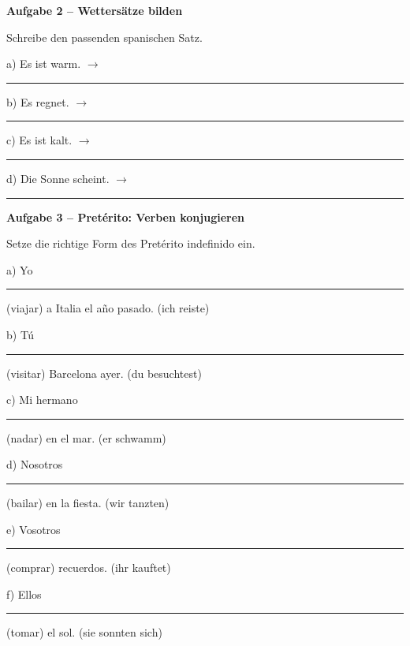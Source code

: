 \documentclass[11pt, a4paper]{article}
\newcommand{\fachfarbe}{spanisch}
\newcommand{\punktebox}[1]{\hfill\fbox{\small \_/#1}}
\newcommand{\luecke}[1]{\rule{#1}{0.4pt}}
\newenvironment{aufgabe}[1]{%
    \needspace{5\baselineskip}%
    \nopagebreak[4]%
    \vspace{10pt}
    \noindent\textbf{\textcolor{\fachfarbe}{Aufgabe #1}}
    \nopagebreak[4]%
    \vspace{5pt}
    \nopagebreak[4]%
    \begin{list}{}{\leftmargin=0pt}
    \item[]
}{%
    \end{list}
}
\begin{document}
\begin{aufgabe}{2 -- Wettersätze bilden}
Schreibe den passenden spanischen Satz. \punktebox{4}
\end{aufgabe}

\noindent
a) Es ist warm. $\rightarrow$ \luecke{6cm}

\vspace{0.8em}

\noindent
b) Es regnet. $\rightarrow$ \luecke{6cm}

\vspace{0.8em}

\noindent
c) Es ist kalt. $\rightarrow$ \luecke{6cm}

\vspace{0.8em}

\noindent
d) Die Sonne scheint. $\rightarrow$ \luecke{6cm}

\vspace{15pt}


\begin{aufgabe}{3 -- Pretérito: Verben konjugieren}
Setze die richtige Form des Pretérito indefinido ein. \punktebox{6}
\end{aufgabe}

\noindent
a) Yo \luecke{3cm} (viajar) a Italia el año pasado. \hfill (ich reiste)

\vspace{0.8em}

\noindent
b) Tú \luecke{3cm} (visitar) Barcelona ayer. \hfill (du besuchtest)

\vspace{0.8em}

\noindent
c) Mi hermano \luecke{3cm} (nadar) en el mar. \hfill (er schwamm)

\vspace{0.8em}

\noindent
d) Nosotros \luecke{3cm} (bailar) en la fiesta. \hfill (wir tanzten)

\vspace{0.8em}

\noindent
e) Vosotros \luecke{3cm} (comprar) recuerdos. \hfill (ihr kauftet)

\vspace{0.8em}

\noindent
f) Ellos \luecke{3cm} (tomar) el sol. \hfill (sie sonnten sich)
\end{document}
